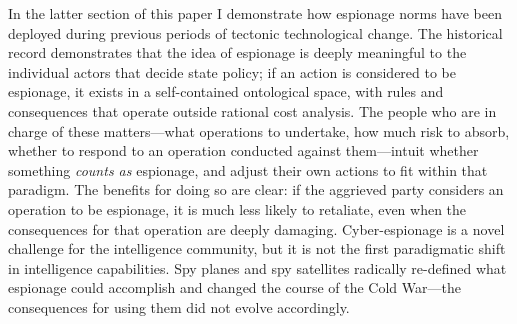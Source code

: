 \documentclass[12pt]{extarticle}
\begin{document}
In the latter section of this paper I demonstrate how espionage norms have been deployed during previous periods of tectonic technological change. The historical record demonstrates that the idea of espionage is deeply meaningful to the individual actors that decide state policy; if an action is considered to be espionage, it exists in a self-contained ontological space, with rules and consequences that operate outside rational cost analysis. The people who are in charge of these matters---what operations to undertake, how much risk to absorb, whether to respond to an operation conducted against them---intuit whether something \emph{counts as} espionage, and adjust their own actions to fit within that paradigm. The benefits for doing so are clear: if the aggrieved party considers an operation to be espionage, it is much less likely to retaliate, even when the consequences for that operation are deeply damaging. Cyber-espionage is a novel challenge for the intelligence community, but it is not the first paradigmatic shift in intelligence capabilities. Spy planes and spy satellites radically re-defined what espionage could accomplish and changed the course of the Cold War---the consequences for using them did not evolve accordingly.
\end{document}
